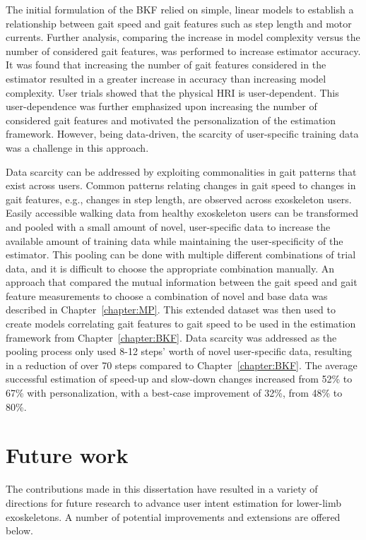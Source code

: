 The initial formulation of the BKF relied on simple, linear models to establish a relationship between gait speed and gait features such as step length and motor currents. Further analysis, comparing the increase in model complexity versus the number of considered gait features, was performed to increase estimator accuracy. It was found that increasing the number of gait features considered in the estimator resulted in a greater increase in accuracy than increasing model complexity. User trials showed that the physical HRI is user-dependent. This user-dependence was further emphasized upon increasing the number of considered gait features and motivated the personalization of the estimation framework. However, being data-driven, the scarcity of user-specific training data was a challenge in this approach. 

Data scarcity can be addressed by exploiting commonalities in gait patterns that exist across users. Common patterns relating changes in gait speed to changes in gait features, e.g., changes in step length, are observed across exoskeleton users. Easily accessible walking data from healthy exoskeleton users can be transformed and pooled with a small amount of novel, user-specific data to increase the available amount of training data while maintaining the user-specificity of the estimator. This pooling can be done with multiple different combinations of trial data, and it is difficult to choose the appropriate combination manually. An approach that compared the mutual information between the gait speed and gait feature measurements to choose a combination of novel and base data was described in Chapter~\ref{chapter:MP}. This extended dataset was then used to create models correlating gait features to gait speed to be used in the estimation framework from Chapter~\ref{chapter:BKF}. Data scarcity was addressed as the pooling process only used 8-12 steps' worth of novel user-specific data, resulting in a reduction of over 70 steps compared to Chapter~\ref{chapter:BKF}. The average successful estimation of speed-up and slow-down changes increased from 52\% to 67\% with personalization, with a best-case improvement of 32\%, from 48\% to 80\%. 

\section{Future work}

The contributions made in this dissertation have resulted in a variety of directions for future research to advance user intent estimation for lower-limb exoskeletons. A number of potential improvements and extensions are offered below.

